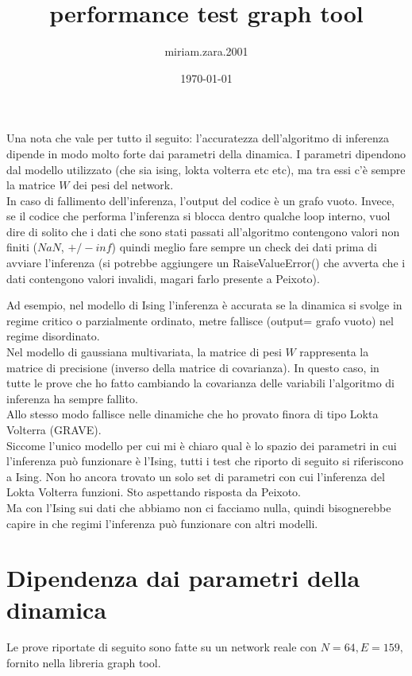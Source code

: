 \documentclass{article}
\title{performance test graph tool}
\author{miriam.zara.2001 }
\date{\today}
\begin{document}
\maketitle

Una nota che vale per tutto il seguito: l'accuratezza dell'algoritmo di inferenza dipende in modo molto forte dai parametri della dinamica. I parametri dipendono dal modello utilizzato (che sia ising, lokta volterra etc etc), ma tra essi c'è sempre la matrice $W$ dei pesi del network. \\

In caso di fallimento dell'inferenza, l'output del codice è un grafo vuoto.
Invece, se il codice che performa l'inferenza si blocca dentro qualche loop interno, vuol dire di solito che i dati che sono stati passati all'algoritmo contengono valori non finiti ($NaN$, $+/-inf$) quindi meglio fare sempre un check dei dati prima di avviare l'inferenza (si potrebbe aggiungere un RaiseValueError() che avverta che i dati contengono valori invalidi, magari farlo presente a Peixoto).



Ad esempio, nel modello di Ising l'inferenza è accurata se la dinamica si svolge in regime critico o parzialmente ordinato, metre fallisce (output= grafo vuoto) nel regime disordinato. \\
Nel modello di gaussiana multivariata, la matrice di pesi $W$ rappresenta la matrice di precisione (inverso della matrice di covarianza). In questo caso, in tutte le prove che ho fatto cambiando la covarianza delle variabili l'algoritmo di inferenza ha sempre fallito. \\
Allo stesso modo fallisce nelle dinamiche che ho provato finora di tipo Lokta Volterra (GRAVE). \\

Siccome l'unico modello per cui mi è chiaro qual è lo spazio dei parametri in cui l'inferenza può funzionare è l'Ising, tutti i test che riporto di seguito si riferiscono a Ising. Non ho ancora trovato un solo set di parametri con cui l'inferenza del Lokta Volterra funzioni. Sto aspettando risposta da Peixoto. \\

Ma con l'Ising sui dati che abbiamo non ci facciamo nulla, quindi bisognerebbe capire in che regimi l'inferenza può funzionare con altri modelli.

\section{Dipendenza dai parametri della dinamica}
Le prove riportate di seguito sono fatte su un network reale  con $N=  64, E= 159, $ fornito nella libreria graph tool.
\end{document}
